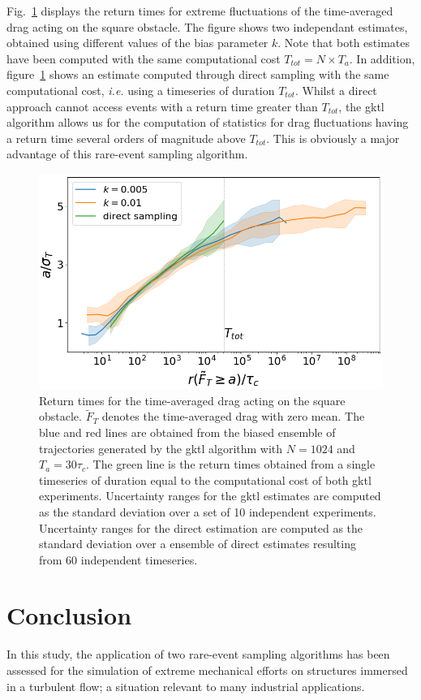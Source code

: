 \documentclass{jfm}
\begin{document}
Fig.~\ref{fig:return_times_gktl} displays the return times for extreme fluctuations of the time-averaged drag acting on the square obstacle.
The figure shows two independant estimates, obtained using different values of the bias parameter $k$.
Note that both estimates have been computed with the same computational cost $T_{tot}=N\times T_a$.
In addition, figure~\ref{fig:return_times_gktl} shows an estimate computed through direct sampling with the same computational cost, \textit{i.e.} using a timeseries of duration $T_{tot}$.
Whilst a direct approach cannot access events with a return time greater than $T_{tot}$, the \ac{gktl} algorithm allows us for the computation of statistics for drag fluctuations having a return time several orders of magnitude above $T_{tot}$. This is  obviously a major advantage of this rare-event sampling algorithm. 

\begin{figure}
	\centering
	\includegraphics[width=.7\linewidth]{return_times_GKTL/return_times_GKTL}
	\caption{\label{fig:return_times_gktl} Return times for the time-averaged drag acting on the square obstacle. $\tilde{F}_T$ denotes the time-averaged drag with zero mean. The blue and red lines are obtained from the biased ensemble of trajectories generated by the \ac{gktl} algorithm with $N=1024$ and $T_a=30\tau_c$. The green line is the return times obtained from a single timeseries of duration equal to the computational cost of both \ac{gktl} experiments. Uncertainty ranges for the \ac{gktl} estimates are computed as the standard deviation over a set of 10 independent experiments. Uncertainty ranges for the direct estimation are computed as the standard deviation over a ensemble of direct estimates resulting from 60 independent timeseries.}
\end{figure}

\section{Conclusion}
\label{conlusion}
In this study, the application of two rare-event sampling algorithms has been assessed for the simulation of extreme mechanical efforts on structures immersed in a turbulent flow; a situation relevant to many industrial applications.
\end{document}
